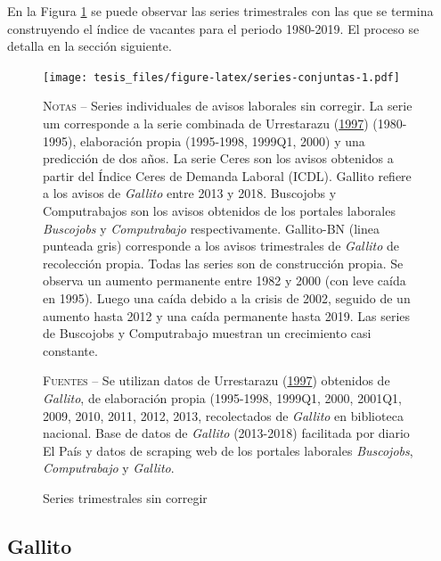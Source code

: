 \documentclass[12pt,oneside]{reedthesis}
\begin{document}
En la Figura \ref{fig:series-conjuntas} se puede observar las series trimestrales con las que se termina construyendo el índice de vacantes para el periodo 1980-2019. El proceso se detalla en la sección siguiente.
\begin{figure}
\texttt{[image: tesis\_files/figure-latex/series-conjuntas-1.pdf]}
\caption{Series trimestrales sin corregir}\label{fig:series-conjuntas}\textsc{}

\footnotesize\textsc{Notas} -- Series individuales de avisos laborales sin corregir. La serie um corresponde a la serie combinada de Urrestarazu (\protect\hyperlink{ref-Urrestarazu1997}{1997}) (1980-1995), elaboración propia (1995-1998, 1999Q1, 2000) y una predicción de dos años. La serie Ceres son los avisos obtenidos a partir del Índice Ceres de Demanda Laboral (ICDL). Gallito refiere a los avisos de \textit{Gallito} entre 2013 y 2018. Buscojobs y Computrabajos son los avisos obtenidos de los portales laborales \textit{Buscojobs} y \textit{Computrabajo} respectivamente. Gallito-BN (linea punteada gris) corresponde a los avisos trimestrales de \textit{Gallito} de recolección propia. Todas las series son de construcción propia. Se observa un aumento permanente entre 1982 y 2000 (con leve caída en 1995). Luego una caída debido a la crisis de 2002, seguido de un aumento hasta 2012 y una caída permanente hasta 2019. Las series de Buscojobs y Computrabajo muestran un crecimiento casi constante.

\textsc{Fuentes} -- Se utilizan datos de Urrestarazu (\protect\hyperlink{ref-Urrestarazu1997}{1997}) obtenidos de \textit{Gallito}, de elaboración propia (1995-1998, 1999Q1, 2000, 2001Q1, 2009, 2010, 2011, 2012, 2013, recolectados de \textit{Gallito} en biblioteca nacional. Base de datos de \textit{Gallito} (2013-2018) facilitada por diario El País y datos de scraping web de los portales laborales \textit{Buscojobs}, \textit{Computrabajo} y \textit{Gallito}.
\end{figure}
\hypertarget{gallito}{%
\subsection{Gallito}\label{gallito}}
\end{document}
